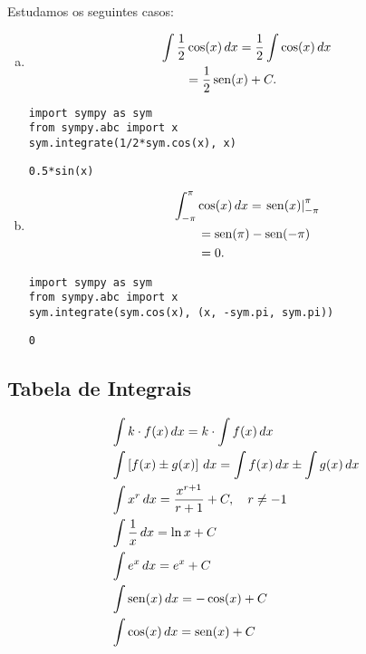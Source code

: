 \begin{ex}
  Estudamos os seguintes casos:
  \begin{enumerate}[a)]
  \item
    \begin{align}
      & \int \frac{1}{2}\cos(x)\,dx = \frac{1}{2}\int\cos(x)\,dx \\
      &\text{}\qquad = \frac{1}{2}\operatorname{sen}(x) + C. \\
    \end{align}

\begin{lstlisting}
import sympy as sym
from sympy.abc import x
sym.integrate(1/2*sym.cos(x), x)
\end{lstlisting}

\begin{verbatim}
0.5*sin(x)
\end{verbatim}

  \item
    \begin{align}
      & \int_{-\pi}^\pi\cos(x)\,dx = \left.\operatorname{sen}(x)\right|_{-\pi}^\pi\\
      &\text{}\qquad = \operatorname{sen}(\pi) - \operatorname{sen}(-\pi)\\
      &\text{}\qquad = 0.
    \end{align}

\begin{lstlisting}
import sympy as sym
from sympy.abc import x
sym.integrate(sym.cos(x), (x, -sym.pi, sym.pi))
\end{lstlisting}

\begin{verbatim}
0
\end{verbatim}

  \end{enumerate}

\end{ex}

\subsection{Tabela de Integrais}

\begin{align}
  & \int k\cdot f(x)\,dx = k\cdot\int f(x)\,dx\\
  & \int \left[f(x)\pm g(x)\right]\,dx = \int f(x)\,dx \pm \int g(x)\,dx\\
  & \int x^r\,dx = \frac{x^{r+1}}{r+1} + C,\quad r\neq -1\\
  & \int \frac{1}{x}\,dx = \ln x + C \\
  & \int e^x\,dx = e^x + C \\
  & \int \operatorname{sen}(x)\,dx = -\cos(x) + C \\
  & \int \cos(x)\,dx = \operatorname{sen}(x) + C
\end{align}

